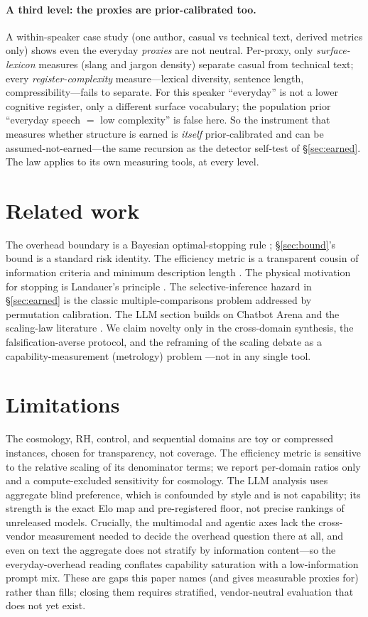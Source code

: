 \documentclass[11pt]{article}
\begin{document}
\paragraph{A third level: the proxies are prior-calibrated too.} A within-speaker
case study (one author, casual vs technical text, derived metrics only) shows even
the everyday \emph{proxies} are not neutral. Per-proxy, only \emph{surface-lexicon}
measures (slang and jargon density) separate casual from technical text; every
\emph{register-complexity} measure---lexical diversity, sentence length,
compressibility---fails to separate. For this speaker ``everyday'' is not a lower
cognitive register, only a different surface vocabulary; the population prior
``everyday speech $=$ low complexity'' is false here. So the instrument that
measures whether structure is earned is \emph{itself} prior-calibrated and can be
assumed-not-earned---the same recursion as the detector self-test of
\S\ref{sec:earned}. The law applies to its own measuring tools, at every level.

\section{Related work}\label{sec:related}
The overhead boundary is a Bayesian optimal-stopping rule \citep{wald1945,chow1971};
\S\ref{sec:bound}'s bound is a standard risk identity. The efficiency metric is a
transparent cousin of information criteria and minimum description length
\citep{akaike1974,schwarz1978,rissanen1978}. The physical motivation for stopping
is Landauer's principle \citep{landauer1961}. The selective-inference hazard in
\S\ref{sec:earned} is the classic multiple-comparisons problem addressed by
permutation calibration. The LLM section builds on Chatbot Arena \citep{chiang2024}
and the scaling-law literature \citep{kaplan2020,hoffmann2022}. We claim novelty
only in the cross-domain synthesis, the falsification-averse protocol, and the
reframing of the scaling debate as a capability-measurement (metrology) problem
---not in any single tool.

\section{Limitations}
The cosmology, RH, control, and sequential domains are toy or compressed instances,
chosen for transparency, not coverage. The efficiency metric is sensitive to the
relative scaling of its denominator terms; we report per-domain ratios only and a
compute-excluded sensitivity for cosmology. The LLM analysis uses aggregate blind
preference, which is confounded by style and is not capability; its strength is the
exact Elo map and pre-registered floor, not precise rankings of unreleased models.
Crucially, the multimodal and agentic axes lack the cross-vendor measurement needed
to decide the overhead question there at all, and even on text the aggregate does
not stratify by information content---so the everyday-overhead reading conflates
capability saturation with a low-information prompt mix. These are gaps this paper
names (and gives measurable proxies for) rather than fills; closing them requires
stratified, vendor-neutral evaluation that does not yet exist.
\end{document}
